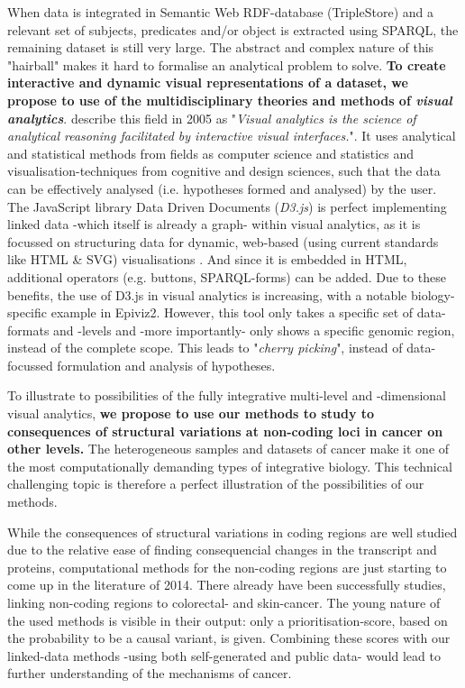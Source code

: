 \documentclass[twoside,fontsize=10pt]{article}
\begin{document}
\noindent
When data is integrated in Semantic Web RDF-database (TripleStore) and a relevant set of subjects, predicates and/or object is extracted using SPARQL, the remaining dataset is still very large. The abstract and complex nature of this "hairball" makes it hard to formalise an analytical problem to solve. \textbf{To create interactive and dynamic visual representations of a dataset, we propose to use of the multidisciplinary theories and methods of \textit{visual analytics}}. \citet{Thomas2005} describe this field in 2005 as "\textit{Visual analytics is the science of analytical reasoning facilitated by interactive visual interfaces.}". It uses analytical and statistical methods from fields as computer science and statistics and visualisation-techniques from cognitive and design sciences, such that the data can be effectively analysed (i.e. hypotheses formed and analysed) by the user. The JavaScript library Data Driven Documents (\textit{D3.js}) is perfect implementing linked data -which itself is already a graph- within visual analytics, as it is focussed on structuring data for dynamic, web-based (using current standards like HTML \& SVG) visualisations \cite{Bostock2011}. And since it is embedded in HTML, additional operators (e.g. buttons, SPARQL-forms) can be added. Due to these benefits, the use of D3.js in visual analytics is increasing, with a notable biology-specific example in Epiviz2\cite{Chelaru2014}. However, this tool only takes a specific set of data-formats and -levels and -more importantly- only shows a specific genomic region, instead of the complete scope. This leads to "\textit{cherry picking}", instead of data-focussed formulation and analysis of hypotheses.
\medskip

\noindent
To illustrate to possibilities of the fully integrative multi-level and -dimensional visual analytics,\textbf{ we propose to use our methods to study to consequences of structural variations at non-coding loci in cancer on other levels.} The heterogeneous samples and datasets of cancer make it one of the most computationally demanding types of integrative biology. This technical challenging topic is therefore a perfect illustration of the possibilities of our methods.

While the consequences of structural variations in coding regions are well studied due to the relative ease of finding consequencial changes in the transcript and proteins\cite{McLaren2010}, computational methods for the non-coding regions are just starting to come up in the literature of 2014\cite{Khurana2013,Kircher2014}. There already have been successfully studies, linking non-coding regions to colorectal- and skin-cancer\cite{Ongen2014,Huang2013}. The young nature of the used methods is visible in their output: only a prioritisation-score, based on the probability to be a causal variant, is given. Combining these scores with our linked-data methods -using both self-generated and public data- would lead to further understanding of the mechanisms of cancer. 
\end{document}
